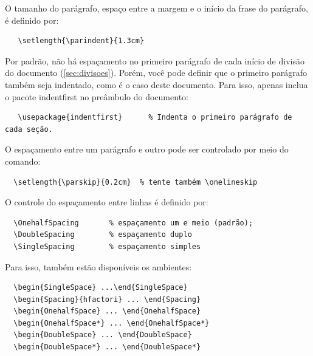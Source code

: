 O tamanho do parágrafo, espaço entre a margem e o início da frase do parágrafo, é definido por:

\begin{verbatim}
   \setlength{\parindent}{1.3cm}
\end{verbatim}

Por padrão, não há espaçamento no primeiro parágrafo de cada início de divisão do documento (\autoref{sec:divisoes}).
  Porém, você pode definir que o primeiro parágrafo também seja indentado, como é o caso deste documento.
  Para isso, apenas inclua o pacote \textsf{indentfirst} no preâmbulo do documento:
\begin{verbatim}
   \usepackage{indentfirst}      % Indenta o primeiro parágrafo de cada seção.
\end{verbatim}

O espaçamento entre um parágrafo e outro pode ser controlado por meio do comando:
\begin{verbatim}
  \setlength{\parskip}{0.2cm}  % tente também \onelineskip
\end{verbatim}

O controle do espaçamento entre linhas é definido por:
\begin{verbatim}
  \OnehalfSpacing       % espaçamento um e meio (padrão); 
  \DoubleSpacing        % espaçamento duplo
  \SingleSpacing        % espaçamento simples  
\end{verbatim}

Para isso, também estão disponíveis os ambientes:
\begin{verbatim}
  \begin{SingleSpace} ...\end{SingleSpace}
  \begin{Spacing}{hfactori} ... \end{Spacing}
  \begin{OnehalfSpace} ... \end{OnehalfSpace}
  \begin{OnehalfSpace*} ... \end{OnehalfSpace*}
  \begin{DoubleSpace} ... \end{DoubleSpace}
  \begin{DoubleSpace*} ... \end{DoubleSpace*} 
\end{verbatim}

